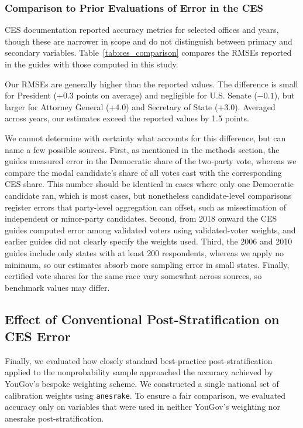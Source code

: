 \documentclass[12pt]{article}
\begin{document}
\subsubsection{Comparison to Prior Evaluations of Error in the CES}

CES documentation reported accuracy metrics for selected offices and years, though these are narrower in scope and do not distinguish between primary and secondary variables. Table~\ref{tab:ces_comparison} compares the RMSEs reported in the guides with those computed in this study.



Our RMSEs are generally higher than the reported values. The difference is small for President (+0.3 points on average) and negligible for U.S. Senate ($-0.1$), but larger for Attorney General (+4.0) and Secretary of State (+3.0). Averaged across years, our estimates exceed the reported values by 1.5 points.

We cannot determine with certainty what accounts for this difference, but can name a few possible sources. First, as mentioned in the methods section, the guides measured error in the Democratic share of the two-party vote, whereas we compare the modal candidate's share of all votes cast with the corresponding CES share. This number should be identical in cases where only one Democratic candidate ran, which is most cases, but nonetheless candidate-level comparisons register errors that party-level aggregation can offset, such as misestimation of independent or minor-party candidates. Second, from 2018 onward the CES guides computed error among validated voters using validated-voter weights, and earlier guides did not clearly specify the weights used. Third, the 2006 and 2010 guides include only states with at least 200 respondents, whereas we apply no minimum, so our estimates absorb more sampling error in small states. Finally, certified vote shares for the same race vary somewhat across sources, so benchmark values may differ.
% 

\subsection{Effect of Conventional Post-Stratification on CES Error}
Finally, we evaluated how closely standard best-practice post-stratification applied to the nonprobability sample approached the accuracy achieved by YouGov’s bespoke weighting scheme. We constructed a single national set of calibration weights using \texttt{anesrake}. To ensure a fair comparison, we evaluated accuracy only on variables that were used in neither YouGov's weighting nor anesrake post-stratification.
\end{document}

